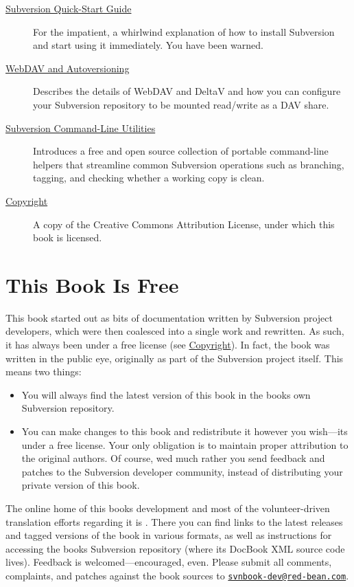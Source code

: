 \begin{description}
\item[{\hyperref[svn.intro]{Subversion Quick-Start Guide}}]
For the impatient, a whirlwind explanation of how to install Subversion
and start using it immediately. You have been warned.
\item[{\hyperref[svn.webdav]{WebDAV and Autoversioning}}]
Describes the details of WebDAV and DeltaV and how you can configure
your Subversion repository to be mounted read/write as a DAV share.
\item[{\hyperref[svn.utils]{Subversion Command-Line Utilities}}]
Introduces a free and open source collection of portable command-line
helpers that streamline common Subversion operations such as branching,
tagging, and checking whether a working copy is clean.
\item[{\hyperref[svn.copyright]{Copyright}}]
A copy of the Creative Commons Attribution License, under which this
book is licensed.
\end{description}

\section{This Book Is Free}\label{svn.preface.free}

This book started out as bits of documentation written by Subversion
project developers, which were then coalesced into a single work and
rewritten. As such, it has always been under a free license (see
\hyperref[svn.copyright]{Copyright}). In fact, the book was written in
the public eye, originally as part of the Subversion project itself.
This means two things:

\begin{itemize}
\item
  You will always find the latest version of this book in the
  book\textquotesingle s own Subversion repository.
\item
  You can make changes to this book and redistribute it however you
  wish---it\textquotesingle s under a free license. Your only obligation
  is to maintain proper attribution to the original authors. Of course,
  we\textquotesingle d much rather you send feedback and patches to the
  Subversion developer community, instead of distributing your private
  version of this book.
\end{itemize}

The online home of this book\textquotesingle s development and most of
the volunteer-driven translation efforts regarding it is
\href{https://svnbook.red-bean.com}{}. There you can find links to the
latest releases and tagged versions of the book in various formats, as
well as instructions for accessing the book\textquotesingle s Subversion
repository (where its DocBook XML source code lives). Feedback is
welcomed---encouraged, even. Please submit all comments, complaints, and
patches against the book sources to
\href{mailto:svnbook-dev@red-bean.com}{\nolinkurl{svnbook-dev@red-bean.com}}.

